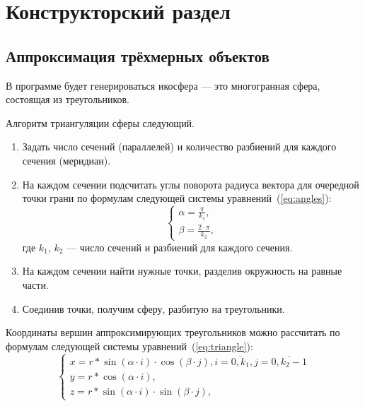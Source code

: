\chapter{Конструкторский раздел}


\section{Аппроксимация трёхмерных объектов}

В программе будет генерироваться икосфера --- это многогранная сфера, состоящая из треугольников.

Алгоритм триангуляции сферы следующий.

\begin{enumerate}
	\item Задать число сечений (параллелей) и количество разбиений для каждого сечения (меридиан).
        \item На каждом сечении подсчитать углы поворота радиуса вектора для очередной точки грани по формулам следующей системы уравнений~(\ref{eq:angles}):
        \begin{equation}\label{eq:angles}
            \begin{cases}
	        \alpha = \frac{\pi}{k_{1}}, \\
                \beta = \frac{2 \cdot \pi}{k_{2}},
            \end{cases}
        \end{equation}
        \noindent где $k_{1}$, $k_{2}$ --- число сечений и разбиений для каждого сечения.
	\item На каждом сечении найти нужные точки, разделив окружность на равные части.
	\item Соединив точки, получим сферу, разбитую на треугольники.
\end{enumerate}

Координаты вершин аппроксимирующих треугольников можно рассчитать по формулам следующей системы уравнений~(\ref{eq:triangle}):
    \begin{equation}\label{eq:triangle}
        \begin{cases}
	    x = r * \sin(\alpha \cdot i) \cdot \cos(\beta \cdot j), i = \overline{0, k_{1}}, j = \overline{0, k_{2} - 1}\\
            y = r * \cos(\alpha \cdot i),\\
            z = r * \sin(\alpha \cdot i) \cdot \sin(\beta \cdot j),
        \end{cases}
    \end{equation}

